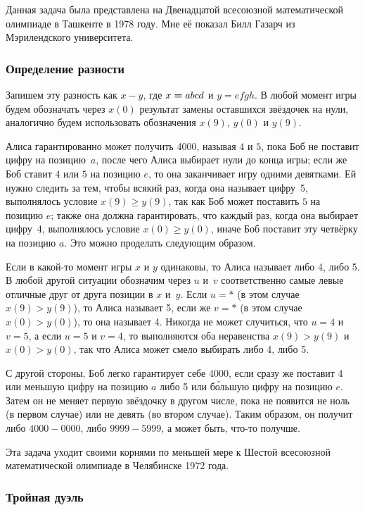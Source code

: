 \documentclass[twoside]{book}
\begin{document}
Данная задача была представлена на Двенадцатой всесоюзной математической олимпиаде в Ташкенте в 1978 году.
Мне её показал Билл Газарч из Мэрилендского университета.%

\subsubsection*{Определение разности}%

Запишем эту разность как $x-y$, где $x\hm=abcd$ и $y=efgh$.
В любой момент игры будем обозначать через $x(0)$ результат замены оставшихся звёздочек на нули, аналогично будем использовать обозначения $x(9)$, $y(0)$ и $y(9)$.

Алиса гарантированно может получить 4000, называя $4$ и $5$, пока Боб не поставит цифру на позицию~$a$, после чего Алиса выбирает нули до конца игры;
если же Боб ставит $4$ или $5$ на позицию $e$, то она заканчивает игру одними девятками.
Ей нужно следить за тем, чтобы всякий раз, когда она называет цифру~5, выполнялось условие $x(9)\ge y(9)$, так как Боб может поставить $5$ на позицию $e$;
также она должна гарантировать, что каждый раз, когда она выбирает цифру~4, выполнялось условие $x(0)\ge y(0)$, иначе Боб поставит эту четвёрку на позицию $a$.
Это можно проделать следующим образом.

Если в какой-то момент игры $x$ и $y$ одинаковы, то Алиса называет либо 4, либо 5.
В любой другой ситуации обозначим через $u$ и~$v$ соответственно самые левые отличные друг от друга позиции в $x$ и~$y$.
Если $u=*$ (в этом случае $x(9)> y(9)$), то Алиса называет 5, если же $v=*$ (в этом случае $x(0)> y(0)$), то она называет 4.
Никогда не может случиться, что $u=4$ и $v=5$, а если $u=5$ и $v=4$, то выполняются оба неравенства $x(9)> y(9)$ и $x(0)> y(0)$, так что Алиса может смело выбирать либо 4, либо 5.

С другой стороны, Боб легко гарантирует себе 4000, если сразу же поставит 4 или меньшую цифру на позицию $a$ либо 5 или б\'{о}льшую цифру на позицию $e$.
Затем он не меняет первую звёздочку в другом числе, пока не появится не ноль (в первом случае) или не девять (во втором случае).
Таким образом, он получит либо $4000-0000$, либо $9999-5999$, а может быть, что-то получше.
\heart

Эта задача уходит своими корнями по меньшей мере к Шестой всесоюзной математической олимпиаде в Челябинске 1972 года.

\subsubsection*{Тройная дуэль}%
\end{document}
